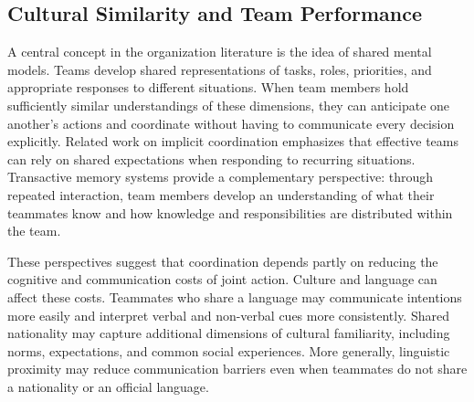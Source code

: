 \documentclass[10pt]{article}
\begin{document}
 

 
\subsection{Cultural Similarity and Team Performance}
A central concept in the organization literature is the idea of shared mental models. Teams develop shared representations of tasks, roles, priorities, and appropriate responses to different situations. When team members hold sufficiently similar understandings of these dimensions, they can anticipate one another's actions and coordinate without having to communicate every decision explicitly. Related work on implicit coordination emphasizes that effective teams can rely on shared expectations when responding to recurring situations. Transactive memory systems provide a complementary perspective: through repeated interaction, team members develop an understanding of what their teammates know and how knowledge and responsibilities are distributed within the team.

These perspectives suggest that coordination depends partly on reducing the cognitive and communication costs of joint action. Culture and language can affect these costs. Teammates who share a language may communicate intentions more easily and interpret verbal and non-verbal cues more consistently. Shared nationality may capture additional dimensions of cultural familiarity, including norms, expectations, and common social experiences. More generally, linguistic proximity may reduce communication barriers even when teammates do not share a nationality or an official language.
\end{document}
